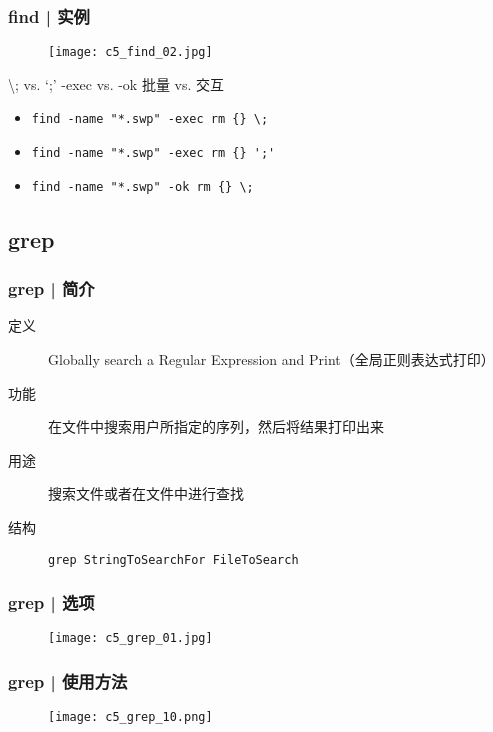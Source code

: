 \begin{frame}[fragile]
  \frametitle{find | \alert{实例}}
  \begin{figure}
    \centering
    \texttt{[image: c5\_find\_02.jpg]}
  \end{figure}
  \pause
  \begin{block}{\textbackslash; vs. `;' \qquad -exec vs. -ok \quad 批量 vs. 交互}
  \begin{itemize}
    \item \verb|find -name "*.swp" -exec rm {} \;|
    \item \verb|find -name "*.swp" -exec rm {} ';'|
    \item \verb|find -name "*.swp" -ok rm {} \;|
  \end{itemize}
  \end{block}
\end{frame}

\subsection{grep}
\begin{frame}[fragile]
  \frametitle{grep | 简介}
  \begin{description}
    \item[定义] Globally search a Regular Expression and Print（全局正则表达式打印）
    \item[功能] 在文件中搜索用户所指定的序列，然后将结果打印出来
    \item[用途] 搜索文件或者在文件中进行查找
    \item[结构] \verb|grep StringToSearchFor FileToSearch|
  \end{description}
\end{frame}

\begin{frame}
  \frametitle{grep | \alert{选项}}
  \begin{figure}
    \centering
    \texttt{[image: c5\_grep\_01.jpg]}
  \end{figure}
\end{frame}

\begin{frame}
  \frametitle{grep | 使用方法}
  \begin{figure}
    \centering
    \texttt{[image: c5\_grep\_10.png]}
  \end{figure}
\end{frame}


